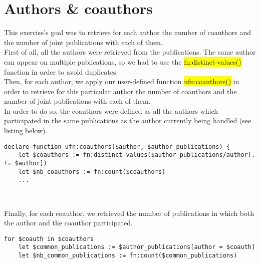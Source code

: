 \section{Authors \& coauthors}

This exercise's goal was to retrieve for each author the number of coauthors
and the number of joint publications with each of them.\\

First of all, all the authors were retrieved from the publications. The same
author can appear on multiple publications, so we had to use the
\hl{fn:distinct-values()} function in order to avoid duplicates.\\

Then, for each author, we apply our user-defined function \hl{ufn:coauthors()}
in order to retrieve for this particular author the number of coauthors and
the number of joint publications with each of them.\\

In order to do so, the coauthors were defined as all the authors which
participated in the same publications as the author currently being handled
(see listing below).\\

\begin{lstlisting}
declare function ufn:coauthors($author, $author_publications) {
    let $coauthors := fn:distinct-values($author_publications/author[. != $author])
    let $nb_coauthors := fn:count($coauthors)
    ...
\end{lstlisting}
\

Finally, for each coauthor, we retrieved the number of publications in which
both the author and the coauthor participated.\\

\begin{lstlisting}
for $coauth in $coauthors
    let $common_publications := $author_publications[author = $coauth]
    let $nb_common_publications := fn:count($common_publications)
\end{lstlisting}

\newpage

